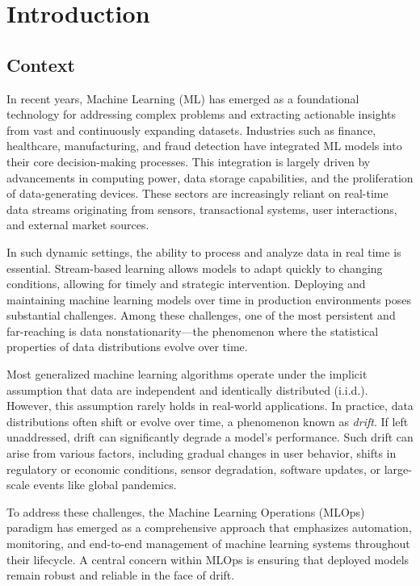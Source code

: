 \chapter{Introduction}\label{ch:introduction}

\section{Context}\label{sec:context}
In recent years, Machine Learning (ML) has emerged as a foundational technology
for addressing complex problems and extracting actionable insights from vast
and continuously expanding datasets. Industries such as finance, healthcare,
manufacturing, and fraud detection have integrated ML models into their core
decision-making processes. This integration is largely driven by advancements
in computing power, data storage capabilities, and the proliferation of
data-generating devices. These sectors are increasingly reliant on real-time
data streams originating from sensors, transactional systems, user
interactions, and external market sources.

In such dynamic settings, the ability to process and analyze data in real time
is essential. Stream-based learning allows models to adapt quickly to changing
conditions, allowing for timely and strategic intervention. Deploying and
maintaining machine learning models over time in production environments poses
substantial challenges. Among these challenges, one of the most persistent and
far-reaching is data nonstationarity—the phenomenon where the statistical
properties of data distributions evolve over time.

Most generalized machine learning algorithms operate under the implicit
assumption that data are independent and identically distributed (i.i.d.).
However, this assumption rarely holds in real-world applications. In practice,
data distributions often shift or evolve over time, a phenomenon known as
\emph{drift}. If left unaddressed, drift can significantly degrade a model's
performance. Such drift can arise from various factors, including gradual
changes in user behavior, shifts in regulatory or economic conditions, sensor
degradation, software updates, or large-scale events like global pandemics.

To address these challenges, the Machine Learning Operations
(MLOps)~\cite{mlops} paradigm has emerged as a comprehensive approach that
emphasizes automation, monitoring, and end-to-end management of machine
learning systems throughout their lifecycle. A central concern within MLOps is
ensuring that deployed models remain robust and reliable in the face of drift.

